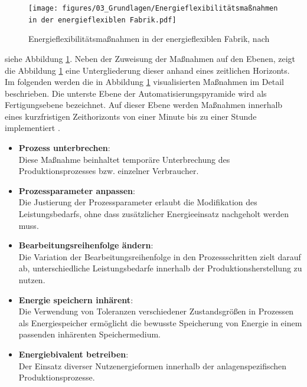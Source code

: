 \begin{figure}[H]
	\centering
	\texttt{[image: figures/03\_Grundlagen/Energieflexibilitätsmaßnahmen in der energieflexiblen Fabrik.pdf]}
	\caption{Energieflexibilitätsmaßnahmen in der energieflexiblen Fabrik, nach \cite{VDI5207Blatt2020}}
	\label{fig_03Energieflexibilitätsmaßnahmen in der energieflexiblen Fabrik}
\end{figure}

siehe Abbildung \ref{fig_03Energieflexibilitätsmaßnahmen in der energieflexiblen Fabrik}. Neben der Zuweisung der Maßnahmen auf den Ebenen, zeigt die Abbildung \ref{fig_03Energieflexibilitätsmaßnahmen in der energieflexiblen Fabrik} eine Untergliederung dieser anhand eines zeitlichen Horizonts.\\

Im folgenden werden die in Abbildung \ref{fig_03Energieflexibilitätsmaßnahmen in der energieflexiblen Fabrik} visualisierten Maßnahmen im Detail beschrieben. Die unterste Ebene der Automatisierungspyramide wird als Fertigungsebene bezeichnet. Auf dieser Ebene werden Maßnahmen innerhalb eines kurzfristigen Zeithorizonts von einer Minute bis zu einer Stunde implementiert \cite{VDI5207Blatt2020}. 

\begin{itemize}[label={--}]
	\item \textbf{Prozess unterbrechen}: \\Diese Maßnahme beinhaltet temporäre Unterbrechung des Produktionsprozesses bzw. einzelner Verbraucher. 
	\item \textbf{Prozessparameter anpassen}:\\Die Justierung der Prozessparameter erlaubt die Modifikation des Leistungsbedarfs, ohne dass zusätzlicher Energieeinsatz nachgeholt werden muss.
	\item \textbf{Bearbeitungsreihenfolge ändern}:\\ Die Variation der Bearbeitungsreihenfolge in den Prozessschritten zielt darauf ab, unterschiedliche Leistungsbedarfe innerhalb der Produktionsherstellung zu nutzen.
	\item \textbf{Energie speichern inhärent}:\\Die Verwendung von Toleranzen verschiedener Zustandsgrößen in Prozessen als Energiespeicher ermöglicht die bewusste Speicherung von Energie in einem passenden inhärenten Speichermedium.
	\item \textbf{Energiebivalent betreiben}:\\ Der Einsatz diverser Nutzenergieformen innerhalb der anlagenspezifischen Produktionsprozesse.
\end{itemize}

